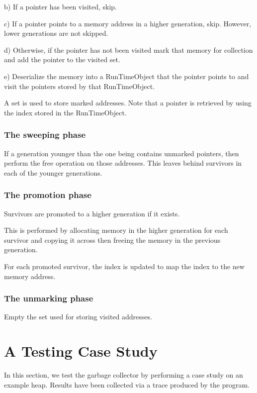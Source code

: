 \documentclass{article}
\begin{document}
b) If a pointer has been visited, skip.
  
c) If a pointer points to a memory address in a higher generation, skip. However, lower generations are not skipped.

d) Otherwise, if the pointer has not been visited mark that memory for collection and add the pointer to the visited set.

e) Deserialize the memory into a RunTimeObject that the pointer points to and visit the pointers stored by that RunTimeObject.

A set is used to store marked addresses. Note that a pointer is retrieved by using the index stored in the RunTimeObject.

\subsubsection{The sweeping phase}

If a generation younger than the one being contains unmarked pointers, then perform the free operation on those addresses. This leaves behind survivors in each of the younger generations. 

\subsubsection{The promotion phase}

Survivors are promoted to a higher generation if it exists.

This is performed by allocating memory in the higher generation for each survivor and copying it across then freeing the memory in the previous generation.

For each promoted survivor, the index is updated to map the index to the new memory address. 

\subsubsection{The unmarking phase}

Empty the set used for storing visited addresses.

\section{A Testing Case Study}

In this section, we test the garbage collector by performing a case study on an example heap. Results have been collected via a trace produced by the program.
\end{document}

